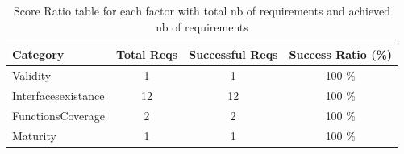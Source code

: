 \documentclass{article}
\begin{document}
						\begin{table}
						\centering
						\caption{Score Ratio table for each factor with total nb of requirements and achieved nb of requirements}
						\begin{tabular}{|l|c|c|c|}
						\hline
						Category & Total Reqs & Successful Reqs & Success Ratio (\%) \\
						\hline

							    Validity & 1 & 1 & 100 \% \\
							 

							    Interfacesexistance & 12 & 12 & 100 \% \\
							 

							    FunctionsCoverage & 2 & 2 & 100 \% \\
							 

							    Maturity & 1 & 1 & 100 \% \\
							 
					
						
						\hline
						\end{tabular}
						\end{table}




										
								

			
\end{document}
